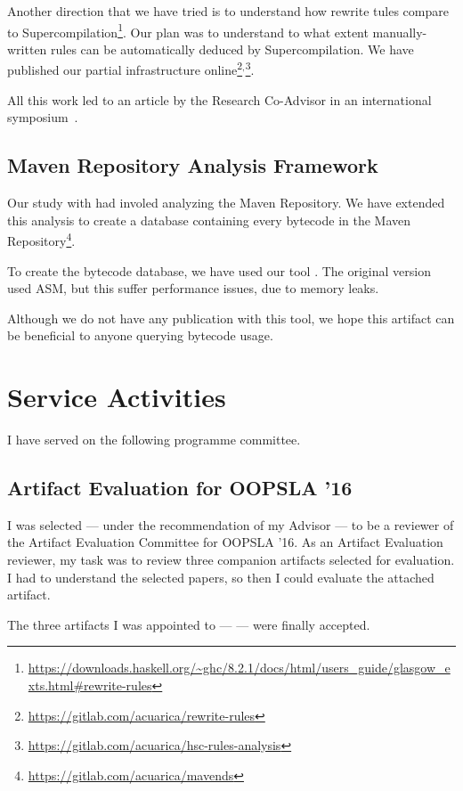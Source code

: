 Another direction that we have tried is to understand how rewrite tules compare to Supercompilation\footnote{\url{https://downloads.haskell.org/~ghc/8.2.1/docs/html/users_guide/glasgow_exts.html\#rewrite-rules}}.
Our plan was to understand to what extent manually-written rules can be automatically deduced by Supercompilation.
We have published our partial infrastructure online\footnote{\url{https://gitlab.com/acuarica/rewrite-rules}}$^{,}$\footnote{\url{https://gitlab.com/acuarica/hsc-rules-analysis}}.

All this work led to an article by the Research Co-Advisor in an international symposium~\cite{Nystrom:2017:SFS:3136000.3136011}.

\subsection*{Maven Repository Analysis Framework}

Our study with \smu{} had involed analyzing the Maven Repository.
We have extended this analysis to create a database containing every bytecode in the Maven Repository\footnote{\url{https://gitlab.com/acuarica/mavends}}.

To create the bytecode database, we have used our tool \jnif{}.
The original version used ASM, but this suffer performance issues, due to memory leaks. 

Although we do not have any publication with this tool, we hope this artifact can be beneficial to anyone querying bytecode usage.

\section{Service Activities} \label{sec:service}

I have served on the following programme committee.

\subsection*{Artifact Evaluation for OOPSLA '16}

I was selected --- under the recommendation of my Advisor --- to be a reviewer of the Artifact Evaluation Committee for OOPSLA '16.
As an Artifact Evaluation reviewer, my task was to review three companion artifacts selected for evaluation.
I had to understand the selected papers, so then I could evaluate the attached artifact.

The three artifacts I was appointed to --- \cite{Ancona:2016:SSI:2983990.2983992,DiLorenzo:2016:IFD:2983990.2984034,Stefanescu:2016:SPV:2983990.2984027} --- were finally accepted.


